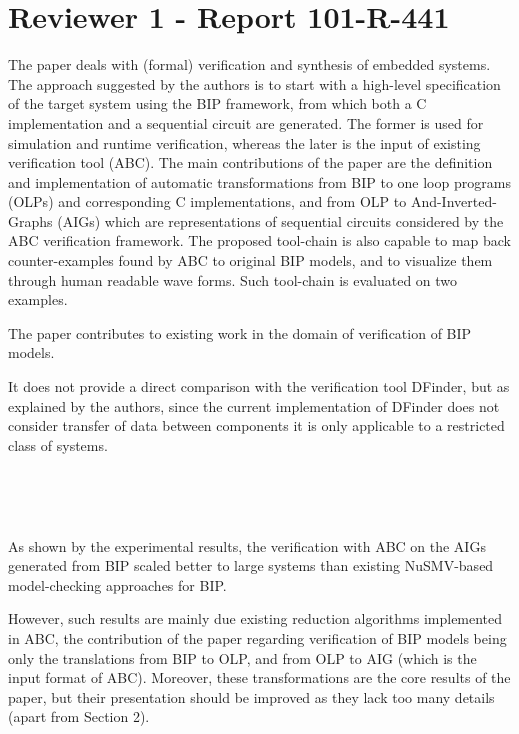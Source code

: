 \section{Reviewer 1 - Report 101-R-441}
The paper deals with (formal) verification and synthesis of embedded systems.
The approach suggested by the authors is to start with a high-level 
specification of the target system using the BIP framework, from which both a 
C implementation and a sequential circuit are generated.
The former is used for simulation and runtime verification, whereas the later 
is the input of existing verification tool (ABC).
The main contributions of the paper are the definition and implementation of 
automatic transformations from BIP to one loop programs (OLPs) and 
corresponding C implementations, and from OLP to And-Inverted-Graphs (AIGs) 
which are representations of sequential circuits considered by the ABC 
verification framework.
The proposed tool-chain is also capable to map back counter-examples found by 
ABC to original BIP models, and to visualize them through human readable wave 
forms.
Such tool-chain is evaluated on two examples.

The paper contributes to existing work in the domain of verification of BIP 
models.

It does not provide a direct comparison with the verification tool DFinder, 
but as explained by the authors, since the current implementation of DFinder 
does not consider transfer of data between components it is only applicable 
to a restricted class of systems.

~


~

As shown by the experimental results, the verification with ABC on the AIGs 
generated from BIP scaled better to large systems than existing NuSMV-based 
model-checking approaches for BIP.

However, such results are mainly due existing reduction algorithms 
implemented in ABC, the contribution of the paper regarding verification of 
BIP models being only the translations from BIP to OLP, and from OLP to AIG 
(which is the input format of ABC).
Moreover, these transformations are the core results of the paper, but their 
presentation should be improved as they lack too many details (apart from 
Section 2).

